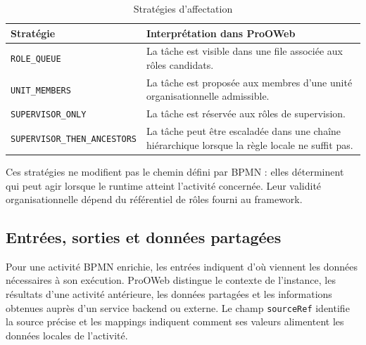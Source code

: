 
\begin{table}[H]
\centering
\caption{Stratégies d'affectation}
\label{tab:chap3-strategies-affectation}
\begin{tabularx}{\textwidth}{p{6.2cm}X}
\toprule
\textbf{Stratégie} & \textbf{Interprétation dans ProOWeb} \\
\midrule
\texttt{ROLE\_QUEUE} & La tâche est visible dans une file associée aux rôles candidats. \\
\texttt{UNIT\_MEMBERS} & La tâche est proposée aux membres d'une unité organisationnelle admissible. \\
\texttt{SUPERVISOR\_ONLY} & La tâche est réservée aux rôles de supervision. \\
\texttt{SUPERVISOR\_THEN\_ANCESTORS} & La tâche peut être escaladée dans une chaîne hiérarchique lorsque la règle locale ne suffit pas. \\
\bottomrule
\end{tabularx}
\end{table}

Ces stratégies ne modifient pas le chemin défini par BPMN : elles déterminent
qui peut agir lorsque le runtime atteint l'activité concernée. Leur validité
organisationnelle dépend du référentiel de rôles fourni au framework.

\subsection{Entrées, sorties et données partagées}

Pour une activité BPMN enrichie, les entrées indiquent d'où viennent les
données nécessaires à son exécution. ProOWeb distingue le contexte de
l'instance, les résultats d'une activité antérieure, les données partagées et
les informations obtenues auprès d'un service backend ou externe. Le champ
\texttt{sourceRef} identifie la source précise et les mappings indiquent comment
ses valeurs alimentent les données locales de l'activité.

